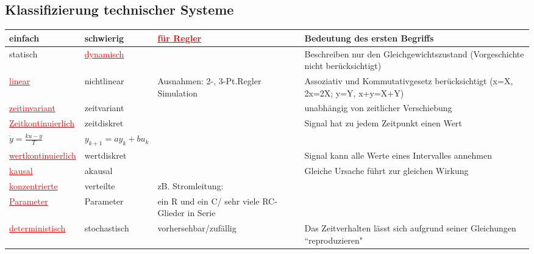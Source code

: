 		
		\begin{table}
		\subsection{Klassifizierung technischer Systeme}
		\begin{tabular}{|p{3cm}|p{2.5cm}|p{7cm}|p{11.5cm}|}
        	\hline
        	
        	einfach &
        	schwierig &
        	\textcolor{red}{\underline{für Regler}} &
        	Bedeutung des ersten Begriffs\\
        	\hline
        	
        	statisch &
        	\textcolor{red}{\underline{dynamisch}} &
        	&
        	Beschreiben nur den Gleichgewichtszustand (Vorgeschichte nicht
        	berücksichtigt)\\
        	\hline
        	
        	\textcolor{red}{\underline{linear}}	&
        	nichtlinear &
        	Ausnahmen: 2-, 3-Pt.Regler Simulation &
        	Assoziativ und Kommutativgesetz berücksichtigt \newline (x=X, 2x=2X;
        	y=Y, x+y=X+Y)\\
        	\hline
        	
        	\textcolor{red}{\underline{zeitinvariant}} &
        	zeitvariant &
        	&
        	unabhängig von zeitlicher Verschiebung \\
        	\hline
        	
        	\textcolor{red}{\underline{Zeitkontinuierlich}} &
        	zeitdiskret &
        	&
        	Signal hat zu jedem Zeitpunkt einen Wert\\
        	$\dot{y}=\frac{ku-y}{T}$ &
        	$y_{k+1}=a y_k + b u_k$	&
        	&
        	\\
        	\hline
        	
        	\textcolor{red}{\underline{wertkontinuierlich}}&
        	wertdiskret&
        	&
        	Signal kann alle Werte eines Intervalles annehmen\\
        	\hline
        	
        	\textcolor{red}{\underline{kausal}}	&
        	akausal	&
        	&
        	Gleiche Ursache führt zur gleichen Wirkung\\
        	\hline
        	
        	\textcolor{red}{\underline{konzentrierte}} &
        	verteilte &
        	zB.	Stromleitung: &
        	\\
        	\textcolor{red}{\underline{Parameter}} &
        	Parameter	&
        	ein R und ein C/ sehr viele RC-Glieder in Serie &
        	\\
        	\hline
        	
        	\textcolor{red}{\underline{deterministisch}}	&
        	stochastisch &
        	vorhersehbar/zufällig &
        	Das Zeitverhalten lässt sich aufgrund seiner Gleichungen
        	``reproduzieren"\\
        	\hline
        \end{tabular}
        \end{table}